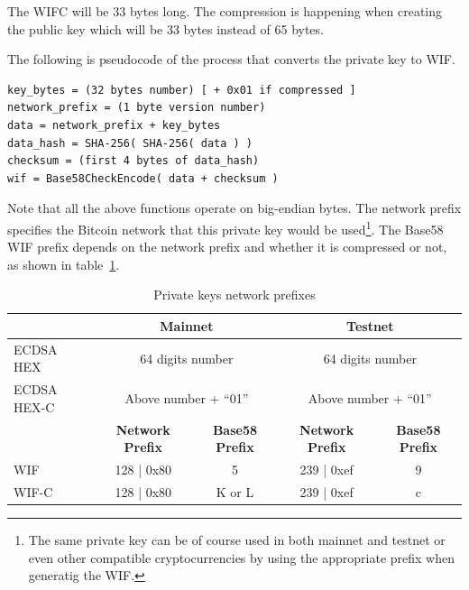 \begin{note}
The WIFC will be 33 bytes long. The compression is happening when creating the public key which will be 33 bytes instead of 65 bytes.
\end{note}

The following is pseudocode of the process that converts the private key to WIF.

\begin{emphbox}
\begin{lstlisting}
key_bytes = (32 bytes number) [ + 0x01 if compressed ]
network_prefix = (1 byte version number)
data = network_prefix + key_bytes
data_hash = SHA-256( SHA-256( data ) )
checksum = (first 4 bytes of data_hash)
wif = Base58CheckEncode( data + checksum )
\end{lstlisting}
\end{emphbox}

Note that all the above functions operate on big-endian bytes. The network prefix specifies the Bitcoin network that this private key would be used\footnote{The same private key can be of course used in both mainnet and testnet or even other compatible cryptocurrencies by using the appropriate prefix when generatig the WIF.}. The Base58 WIF prefix depends on the network prefix and whether it is compressed or not, as shown in table~\ref{tab:private-key-prefixes}.

\begin{table}[h]
\centering
\begin{tabular}{ |l|c|c|c|c| }
\hline
~ & \multicolumn{2}{c|}{\textbf{Mainnet}} & \multicolumn{2}{c|}{\textbf{Testnet}} \\
\hline
ECDSA HEX & \multicolumn{2}{c|}{64 digits number} & \multicolumn{2}{c|}{64 digits number} \\
\hline
ECDSA HEX-C & \multicolumn{2}{c|}{Above number + ``01''} & \multicolumn{2}{c|}{Above number + ``01''} \\
\hline
~ & \textbf{Network Prefix} & \textbf{Base58 Prefix} & \textbf{Network Prefix} & \textbf{Base58 Prefix} \\
\hline
WIF & 128 | 0x80 & 5 & 239 | 0xef & 9 \\
\hline
WIF-C & 128 | 0x80 & K or L & 239 | 0xef & c \\
\hline
\end{tabular}
\caption{Private keys network prefixes}
\label{tab:private-key-prefixes}
\end{table}

